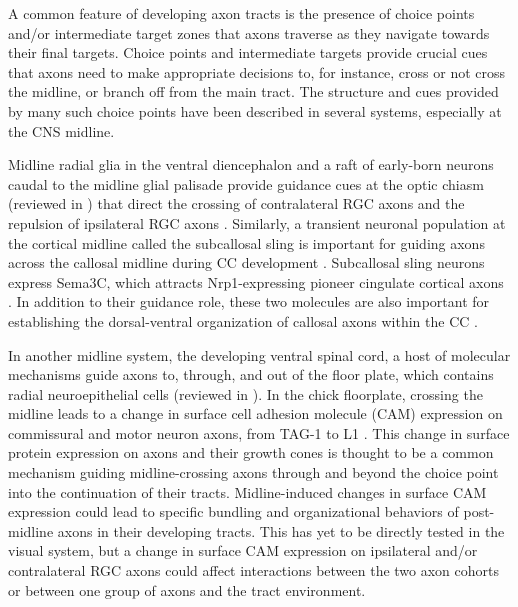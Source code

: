 A common feature of developing axon tracts is the presence of choice points and/or intermediate target zones that axons traverse as they navigate towards their final targets.
Choice points and intermediate targets provide crucial cues that axons need to make appropriate decisions to, for instance, cross or not cross the midline, or branch off from the main tract.
The structure and cues provided by many such choice points have been described in several systems, especially at the CNS midline.

Midline radial glia in the ventral diencephalon and a raft of early-born neurons caudal to the midline glial palisade provide guidance cues at the optic chiasm (reviewed in ) that direct the crossing of contralateral RGC axons \cite{charron2003morphogen,williams2006role,erskine2011vegf,kuwajima2012optic} and the repulsion of ipsilateral RGC axons \cite{williams2003ephrin,petros2009specificity,petros2010ephrin}.
Similarly, a transient neuronal population at the cortical midline called the subcallosal sling is important for guiding axons across the callosal midline during CC development \cite{suarez2014evolution}. 
Subcallosal sling neurons express Sema3C, which attracts Nrp1-expressing pioneer cingulate cortical axons \cite{niquille2009transient,piper2009neuropilin}. 
In addition to their guidance role, these two molecules are also important for establishing the dorsal-ventral organization of callosal axons within the CC \cite{zhou2013axon}. 

In another midline system, the developing ventral spinal cord, a host of molecular mechanisms guide axons to, through, and out of the floor plate, which contains radial neuroepithelial cells (reviewed in ).
In the chick floorplate, crossing the midline leads to a change in surface cell adhesion molecule (CAM) expression on commissural and motor neuron axons, from TAG-1 to L1 \cite{dodd1988spatial}.
This change in surface protein expression on axons and their growth cones is thought to be a common mechanism guiding midline-crossing axons through and beyond the choice point into the continuation of their tracts.
Midline-induced changes in surface CAM expression could lead to specific bundling and organizational behaviors of post-midline axons in their developing tracts.
This has yet to be directly tested in the visual system, but a change in surface CAM expression on ipsilateral and/or contralateral RGC axons could affect interactions between the two axon cohorts or between one group of axons and the tract environment. 

